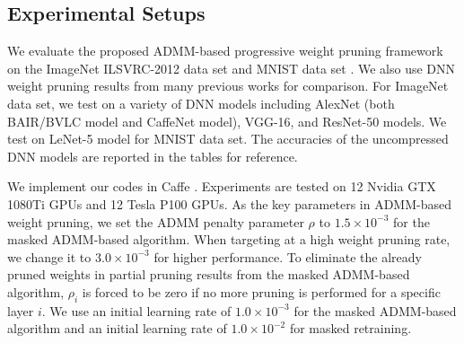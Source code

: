 \documentclass{article} %
\begin{document}




\subsection{Experimental Setups}
We evaluate the proposed ADMM-based progressive weight pruning framework on the ImageNet ILSVRC-2012 data set \citep{deng2009imagenet} and MNIST data set \citep{lecun1998}. 
We also use DNN weight pruning results from many previous works for comparison.
For ImageNet data set, we test on a variety of DNN models including AlexNet (both BAIR/BVLC model and CaffeNet model), VGG-16, and ResNet-50 models. We test on LeNet-5 model for MNIST data set. The accuracies of the uncompressed DNN models are reported in the tables for reference.

We implement our codes in Caffe \citep{jia2014caffe}.
Experiments are tested on 12 Nvidia GTX 1080Ti GPUs and 12 Tesla P100 GPUs.
As the key parameters in ADMM-based weight pruning, we set the ADMM penalty parameter $\rho$ to $1.5\times 10^{-3}$ for the masked ADMM-based algorithm.
When targeting at a high weight pruning rate, we change it to $3.0\times 10^{-3}$ for higher performance.
To eliminate the already pruned weights in partial pruning results from the masked ADMM-based algorithm, $\rho_i$ is forced to be zero if no more pruning is performed for a specific layer $i$.
We use an initial learning rate of $1.0\times 10^{-3}$ for the masked ADMM-based algorithm and an initial learning rate of $1.0\times 10^{-2}$ for masked retraining.
\end{document}
